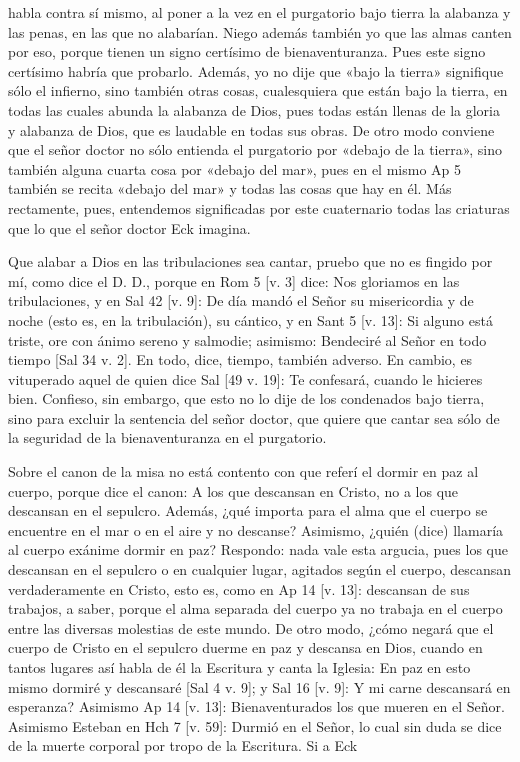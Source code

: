 habla contra sí mismo, al poner a la vez en el purgatorio bajo tierra la alabanza y las penas, en las que no alabarían. Niego además también yo que las almas canten por eso, porque tienen un signo certísimo de bienaventuranza. Pues este signo certísimo habría que probarlo. Además, yo no dije que «bajo la tierra» signifique sólo el infierno, sino también otras cosas, cualesquiera que están bajo la tierra, en todas las cuales abunda la alabanza de Dios, pues todas están llenas de la gloria y alabanza de Dios, que es laudable en todas sus obras. De otro modo conviene que el señor doctor no sólo entienda el purgatorio por «debajo de la tierra», sino también alguna cuarta cosa por «debajo del mar», pues en el mismo Ap 5 también se recita «debajo del mar» y todas las cosas que hay en él. Más rectamente, pues, entendemos significadas por este cuaternario todas las criaturas que lo que el señor doctor Eck imagina.

\marginpar{\small[342]} Que alabar a Dios en las tribulaciones sea cantar, pruebo que no es fingido por mí, como dice el D. D., porque en Rom 5 [v. 3] dice: Nos gloriamos en las tribulaciones, y en Sal 42 [v. 9]: De día mandó el Señor su misericordia y de noche (esto es, en la tribulación), su cántico, y en Sant 5 [v. 13]: Si alguno está triste, ore con ánimo sereno y salmodie; asimismo: Bendeciré al Señor en todo tiempo [Sal 34 v. 2]. En todo, dice, tiempo, también adverso. En cambio, es vituperado aquel de quien dice Sal [49 v. 19]: Te confesará, cuando le hicieres bien. Confieso, sin embargo, que esto no lo dije de los condenados bajo tierra, sino para excluir la sentencia del señor doctor, que quiere que cantar sea sólo de la seguridad de la bienaventuranza en el purgatorio.

Sobre el canon de la misa no está contento con que referí el dormir en paz al cuerpo, porque dice el canon: A los que descansan en Cristo, no a los que descansan en el sepulcro. Además, ¿qué importa para el alma que el cuerpo se encuentre en el mar o en el aire y no descanse? Asimismo, ¿quién (dice) llamaría al cuerpo exánime dormir en paz? Respondo: nada vale esta argucia, pues los que descansan en el sepulcro o en cualquier lugar, agitados según el cuerpo, descansan verdaderamente en Cristo, esto es, como en Ap 14 [v. 13]: descansan de sus trabajos, a saber, porque el alma separada del cuerpo ya no trabaja en el cuerpo entre las diversas molestias de este mundo. De otro modo, ¿cómo negará que el cuerpo de Cristo en el sepulcro duerme en paz y descansa en Dios, cuando en tantos lugares así habla de él la Escritura y canta la Iglesia: En paz en esto mismo dormiré y descansaré [Sal 4 v. 9]; y Sal 16 [v. 9]: Y mi carne descansará en esperanza? Asimismo Ap 14 [v. 13]: Bienaventurados los que mueren en el Señor. Asimismo Esteban en Hch 7 [v. 59]: Durmió en el Señor, lo cual sin duda se dice de la muerte corporal por tropo de la Escritura. Si a Eck

